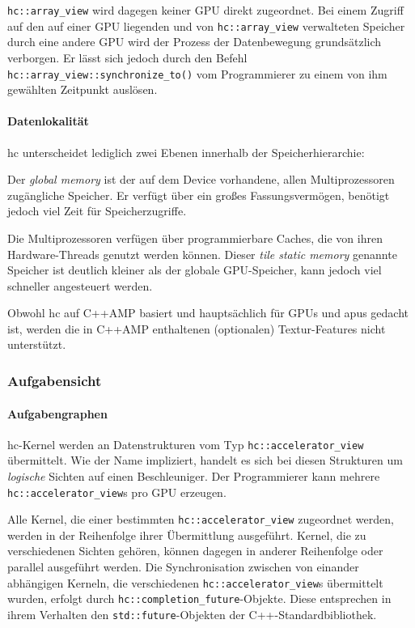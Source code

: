 \texttt{hc::array\_view} wird dagegen keiner GPU direkt zugeordnet. Bei einem
Zugriff auf den auf einer GPU liegenden und von \texttt{hc::array\_view}
verwalteten Speicher durch eine andere GPU wird der Prozess der Datenbewegung
grundsätzlich verborgen. Er lässt sich jedoch durch den Befehl
\texttt{hc::array\_view::synchronize\_to()} vom Programmierer zu einem von ihm
gewählten Zeitpunkt auslösen.

\paragraph{Datenlokalität}

\gls{hc} unterscheidet lediglich zwei Ebenen innerhalb der Speicherhierarchie:

Der \textit{global memory} ist der auf dem Device vorhandene, allen
Multiprozessoren zugängliche Speicher. Er verfügt über ein großes
Fassungsvermögen, benötigt jedoch viel Zeit für Speicherzugriffe.

Die Multiprozessoren verfügen über programmierbare Caches, die von ihren
Hardware-Threads genutzt werden können. Dieser \textit{tile static memory}
genannte Speicher ist deutlich kleiner als der globale GPU-Speicher, kann jedoch
viel schneller angesteuert werden.

Obwohl \gls{hc} auf C++AMP basiert und hauptsächlich für GPUs und \gls{apu}s
gedacht ist, werden die in C++AMP enthaltenen (optionalen) Textur-Features nicht
unterstützt.

\subsubsection{Aufgabensicht}

\paragraph{Aufgabengraphen}

\gls{hc}-Kernel werden an Datenstrukturen vom Typ \texttt{hc::accelerator\_view}
übermittelt. Wie der Name impliziert, handelt es sich bei diesen Strukturen um
\textit{logische} Sichten auf einen Beschleuniger. Der Programmierer kann
mehrere \texttt{hc::accelerator\_view}s pro GPU erzeugen.

Alle Kernel, die einer bestimmten \texttt{hc::accelerator\_view} zugeordnet
werden, werden in der Reihenfolge ihrer Übermittlung ausgeführt. Kernel, die
zu verschiedenen Sichten gehören, können dagegen in anderer Reihenfolge oder
parallel ausgeführt werden. Die Synchronisation zwischen von einander abhängigen
Kerneln, die verschiedenen \texttt{hc::accelerator\_view}s übermittelt wurden,
erfolgt durch \texttt{hc::completion\_future}-Objekte. Diese entsprechen in
ihrem Verhalten den \texttt{std::future}-Objekten der C++-Standardbibliothek.

